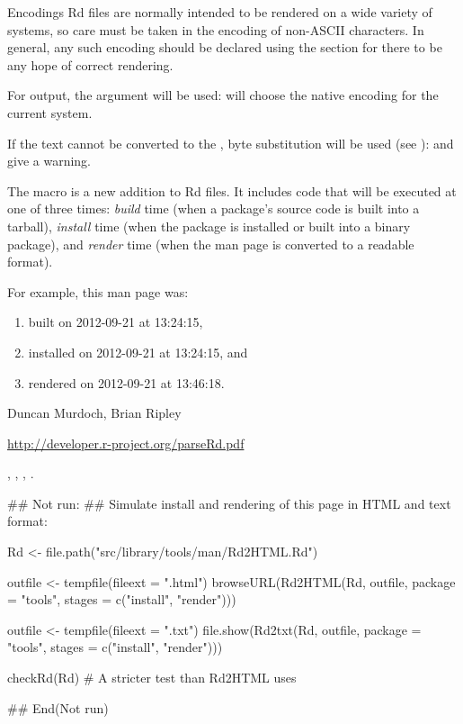 %
\begin{Section}{Encodings}
Rd files are normally intended to be rendered on a wide variety of
systems, so care must be taken in the encoding of non-ASCII
characters.  In general, any such encoding should be declared using
the  section for there to be any hope of correct
rendering.

For output, the  argument will be used:
 will choose the native encoding for the
current system.

If the text cannot be converted to the , byte
substitution will be used (see ): 
and  give a warning. 
\end{Section}
%
\begin{Note}\relax
The  macro is a new addition to Rd files.  It includes
\R{} code that will be executed at one of three times: \emph{build} time
(when a package's source code is built into a tarball), 
\emph{install} time (when the package is installed or
built into a binary package), and \emph{render} time (when the man
page is converted to a readable format).

For example, this man page was:
\begin{enumerate}

\item built on
2012-09-21 at 13:24:15,
\item installed on
2012-09-21 at 13:24:15, and
\item rendered on
2012-09-21 at 13:46:18.

\end{enumerate}

\end{Note}
%
\begin{Author}\relax
Duncan Murdoch, Brian Ripley
\end{Author}
%
\begin{References}\relax
 \url{http://developer.r-project.org/parseRd.pdf} 
\end{References}
%
\begin{SeeAlso}\relax
{}, ,
, .
\end{SeeAlso}
%
\begin{Examples}
\begin{ExampleCode}


## Not run: 
## Simulate install and rendering of this page in HTML and text format:

Rd <- file.path("src/library/tools/man/Rd2HTML.Rd")

outfile <- tempfile(fileext = ".html")
browseURL(Rd2HTML(Rd, outfile, package = "tools",
          stages = c("install", "render")))

outfile <- tempfile(fileext = ".txt")
file.show(Rd2txt(Rd, outfile, package = "tools",
          stages = c("install", "render")))

checkRd(Rd) # A stricter test than Rd2HTML uses

## End(Not run)
\end{ExampleCode}
\end{Examples}
